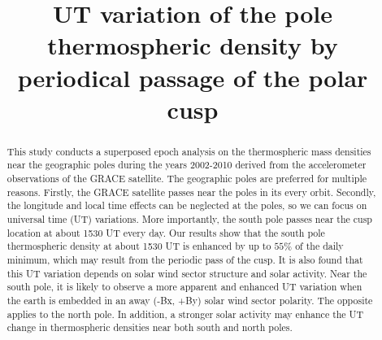 \documentclass[draft, grl]{/home/guod/Documents/template/agu_template/AGUTeX}
\begin{document}
\title{UT variation of the pole thermospheric density by periodical passage of
the polar cusp}


\begin{abstract} 
    This study conducts a superposed epoch analysis on the thermospheric mass 
    densities near the geographic poles during the years 2002-2010 derived from
    the accelerometer observations of the GRACE satellite.
    The geographic poles are preferred for multiple reasons. 
    Firstly, the GRACE satellite passes near the poles in its every orbit.
    Secondly, the longitude and local time effects can be neglected at the 
    poles, so we can focus on universal time (UT) variations. 
    More importantly, the south pole passes near the cusp location at about 1530
    UT every day.
    Our results show that the south pole thermospheric density at about 1530 UT
    is enhanced by up to $55\%$ of the daily minimum, which may result from the
    periodic pass of the cusp.
    It is also found that this UT variation depends on solar wind sector 
    structure and solar activity.
    Near the south pole, it is likely to observe a more apparent and enhanced UT
    variation when the earth is embedded in an away (-Bx, +By) solar wind sector
    polarity.
    The opposite applies to the north pole.
    In addition, a stronger solar activity may enhance the UT change in 
    thermospheric densities near both south and north poles.
\end{abstract}
\end{document}
